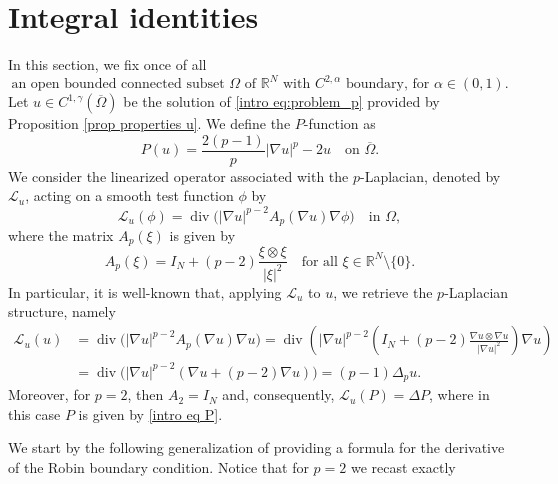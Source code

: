 \documentclass[10pt,a4paper]{amsart}
\numberwithin{equation}{section}
\newcommand{\R}{\mathbb{R}}
\renewcommand{\div}{\operatorname{div}}
\begin{document}
\section{Integral identities}\label{sec: integral identities}
In this section, we fix once of all 
\[
\text{an open bounded connected subset $\Omega$ of } \R^N \text{ with } C^{2,\alpha} \text{ boundary, for } \alpha \in (0,1).
\]
Let $u \in C^{1,\gamma}(\overline{\Omega})$ be the solution of \eqref{intro eq:problem_p} provided by Proposition \ref{prop properties u}. We define the $P$-function as
\begin{equation}\label{eq:P_function}
    P(u) = \frac{2(p-1)}{p}|\nabla u|^p - 2u \quad \text{on } \overline{\Omega}.
\end{equation}
We consider the linearized operator associated with the $p$-Laplacian, denoted by $\mathcal{L}_u$, acting on a smooth test function $\phi$ by
\begin{equation}\label{eq: L(phi)_function}
    \mathcal{L}_u(\phi) = \div\big( |\nabla u|^{p-2} A_p(\nabla u) \nabla \phi \big) \quad \text{in } \Omega,
\end{equation}
where the matrix $A_p(\xi)$ is given by
\begin{equation}\label{eq:matrix_A}
    A_p(\xi) = I_N + (p-2)\frac{\xi \otimes \xi}{|\xi|^2} \quad \text{for all } \xi \in \R^N \setminus \{0\}.
\end{equation}
In particular, it is well-known that, applying $\mathcal{L}_u$ to $u$, we retrieve the $p$-Laplacian structure, namely
\begin{equation}\label{eq: L(u)_u}
\begin{aligned}
    \mathcal{L}_u(u) &= \div\big( |\nabla u|^{p-2} A_p(\nabla u) \nabla u \big) = \div\left( |\nabla u|^{p-2} \left( I_N + (p-2)\frac{\nabla u \otimes \nabla u}{|\nabla u|^2} \right) \nabla u \right) \\
    &= \div\big( |\nabla u|^{p-2} ( \nabla u + (p-2)\nabla u ) \big) = (p-1)\Delta_p u.
\end{aligned}
\end{equation}
Moreover, for $p=2$, then $A_2 = I_N$ and, consequently, $\mathcal{L}_u(P) = \Delta P$, where in this case $P$ is given by \eqref{intro eq P}.                  

We start by the following generalization of \cite[Lemma 1]{gamo26} providing a formula for the derivative of the Robin boundary condition. Notice that for $p=2$ we recast exactly \cite[Eq.\,(3.1)]{gamo26}
\end{document}

